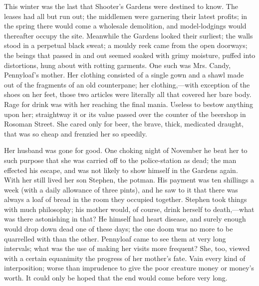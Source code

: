 This winter was the last that Shooter's Gardens were destined to know.
The leases had all but run out; the middlemen were garnering their
latest profits; in the spring there would come a wholesale demolition,
and model-lodgings would thereafter occupy the site. Meanwhile the
Gardens looked their surliest; the walls stood in a perpetual black
sweat; a mouldy reek came from the open doorways; the beings that passed
in and out seemed soaked with grimy moisture, puffed into distortions,
hung about with rotting garments. One such was Mrs. Candy, Pennyloaf's
mother. Her clothing consisted of a single gown and a shawl made out of
the fragments of an old counterpane; her clothing,---with exception of
the shoes on her feet, those two articles were literally all that
covered her bare body. Rage for drink was with her reaching the final
mania. Useless to bestow anything {\protect\hypertarget{4}{}{}}upon her;
straightway it or its value passed over the counter of the beershop in
Rosoman Street. She cared only for beer, the brave, thick, medicated
draught, that was so cheap and frenzied her so speedily.

Her husband was gone for good. One choking night of November he beat her
to such purpose that she was carried off to the police-station as dead;
the man effected his escape, and was not likely to show himself in the
Gardens again. With her still lived her son Stephen, the potman. His
payment was ten shillings a week (with a daily allowance of three
pints), and he saw to it that there was always a loaf of bread in the
room they occupied together. Stephen took things with much philosophy;
his mother would, of course, drink herself to death,---what was there
astonishing in that? He himself had heart disease, and surely enough
would drop down dead one of these days; the one doom was no more to be
quarrelled with than the other. Pennyloaf came to see them at very long
intervals; what was the use of making her visits more frequent? She,
too, viewed with a certain equanimity the progress of her mother's fate.
{\protect\hypertarget{5}{}{}}Vain every kind of interposition; worse
than imprudence to give the poor creature money or money's worth. It
could only be hoped that the end would come before very long.

